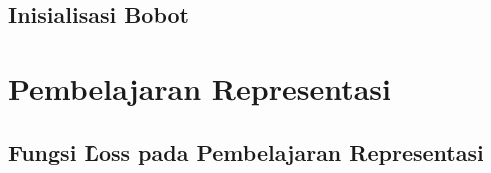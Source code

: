     \subsection{Inisialisasi Bobot}
    \label{sec:kaiminginit}



\section{Pembelajaran Representasi}

    \subsection{Fungsi \f{Loss} pada Pembelajaran Representasi}













        

